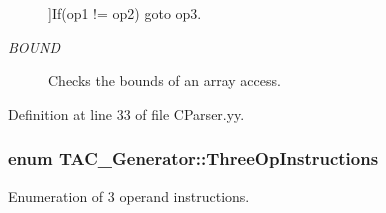 \begin{Desc}
\begin{description}
{}]If(op1 != op2) goto op3. \item[{\em 
\hypertarget{classTAC__Generator_ae032b80a215a10604c5273b65e7dab4ca0fe34906704a5f10788014753af64d88}{B\-O\-U\-N\-D}\label{classTAC__Generator_ae032b80a215a10604c5273b65e7dab4ca0fe34906704a5f10788014753af64d88}
}]Checks the bounds of an array access. \end{description}
\end{Desc}


Definition at line 33 of file C\-Parser.\-yy.

\hypertarget{classTAC__Generator_ae032b80a215a10604c5273b65e7dab4c}{
\subsubsection[{Three\-Op\-Instructions}]{\setlength{\rightskip}{0pt plus 5cm}enum {\bf T\-A\-C\-\_\-\-Generator\-::\-Three\-Op\-Instructions}}}\label{classTAC__Generator_ae032b80a215a10604c5273b65e7dab4c}


Enumeration of 3 operand instructions. 

